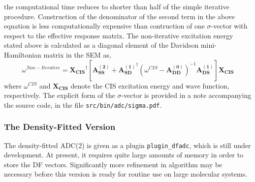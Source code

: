 the computational time reduces to shorter than half of the simple iterative
procedure. Construction of the denominator of the second term in the above
equation is less computationally expensive than contruction of one $\sigma$-vector with respect to the effective response matrix. The non-iterative excitation energy stated above is calculated as a diagonal element of the Davidson mini-Hamiltonian matrix in the SEM as,
\begin{equation*}
\omega^{Non-Iterative}=\mathbf{X_{CIS}}^{\dagger}[\mathbf{A_{SS}^{(2)}}+\mathbf{A_{SD}^{(1)}}^{\dagger}(\omega^{CIS}-\mathbf{A_{DD}^{(0)}})^{-1}\mathbf{A_{DS}^{(1)}}]\mathbf{X_{CIS}}
\end{equation*}
where $\omega^{CIS}$ and $\mathbf{X_{CIS}}$ denote the CIS excitation
energy and wave function, respectively. The explicit form of the 
$\sigma$-vector is provided in a note accompanying the source code,
in the file {\tt src/bin/adc/sigma.pdf}. 

\subsubsection{The Density-Fitted Version}
The density-fitted ADC(2) is given as a plugin \verb|plugin_dfadc|,
which is still under development.  At present, it requires quite large
amounts of memory in order to store the DF vectors. Significantly more
refinement in algorithm may be necessary before this version is ready
for routine use on large molecular systems.

